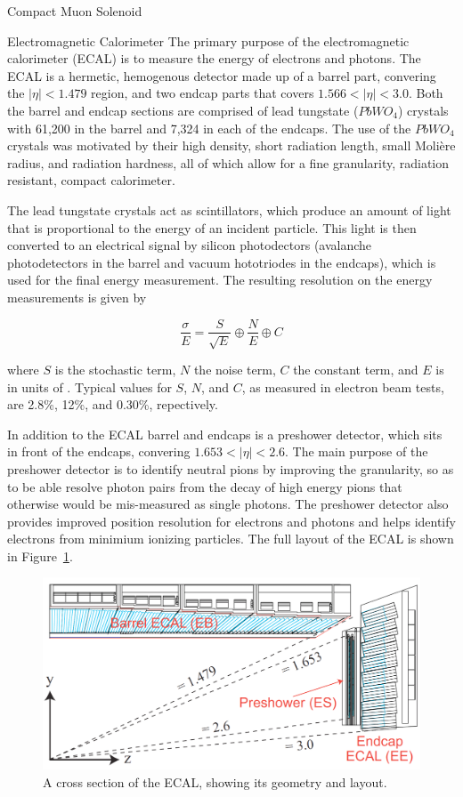 \begin{section}{Compact Muon Solenoid}
\begin{subsection}{Electromagnetic Calorimeter}
The primary purpose of the electromagnetic calorimeter (ECAL) is to measure the energy of electrons and photons.
The ECAL is a hermetic, hemogenous detector made up of a barrel part, convering the $|\eta|<1.479$ region, and two endcap parts that covers $1.566<|\eta|<3.0$.
Both the barrel and endcap sections are comprised of lead tungstate ($PbWO_{4}$) crystals with 61,200 in the barrel and 7,324 in each of the endcaps.
The use of the $PbWO_{4}$ crystals was motivated by their high density, short radiation length, small Moli\`ere radius, and radiation hardness, all of which allow for a fine granularity, radiation resistant, compact calorimeter.

The lead tungstate crystals act as scintillators, which produce an amount of light that is proportional to the energy of an incident particle.
This light is then converted to an electrical signal by silicon photodectors (avalanche photodetectors in the barrel and vacuum hototriodes in the endcaps), which is used for the final energy measurement.
The resulting resolution on the energy measurements is given by 

\begin{equation}
\label{eq:ecal_resolution}
\frac{\sigma}{E} = \frac{S}{\sqrt{E}} \oplus \frac{N}{E} \oplus C
\end{equation}

where $S$ is the stochastic term, $N$ the noise term, $C$ the constant term, and $E$ is in units of \GeV.
Typical values for $S$, $N$, and $C$, as measured in electron beam tests, are 2.8\%, 12\%, and 0.30\%, repectively.

In addition to the ECAL barrel and endcaps is a preshower detector, which sits in front of the endcaps, convering $1.653<|\eta|<2.6$.
The main purpose of the preshower detector is to identify neutral pions by improving the granularity, so as to be able resolve photon pairs from the decay of high energy pions that otherwise would be mis-measured as single photons. 
The preshower detector also provides improved position resolution for electrons and photons and helps identify electrons from minimium ionizing particles.
The full layout of the ECAL is shown in Figure~\ref{fig:cms_ecal}.

\begin{figure}[tbp!]
\begin{center}
\includegraphics[angle=0,width=0.80\columnwidth]{fig/cms_ecal.png}
\end{center}
\caption{A cross section of the ECAL, showing its geometry and layout.~\cite{Isildak:2013kfa}}
\label{fig:cms_ecal}
\end{figure}


\end{subsection}
\end{section}
